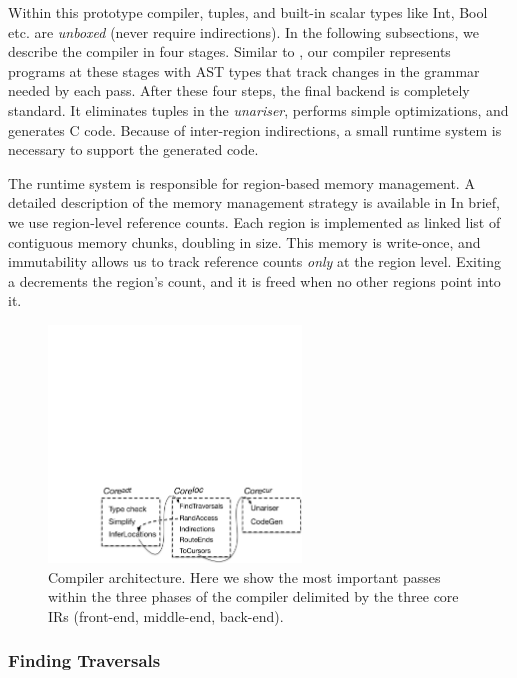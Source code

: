 Within this prototype compiler, tuples, and built-in scalar types like Int, Bool
etc. are \emph{unboxed} (never require indirections).
%
In the following subsections, we describe the
compiler in four stages.
{Similar to \lamcur, our compiler represents
  programs at these stages with AST types that track changes in the
  grammar needed by each pass.
  After these four steps,}
  the final backend is completely standard.  It eliminates
tuples in the \emph{unariser},
performs simple optimizations, and generates C code.
%
Because of inter-region indirections, a small \ourcalc runtime system is
necessary to support the generated code.

The \ourcalc runtime system is responsible for region-based memory management.
A detailed description of the memory management strategy is available in  %
In brief, we use region-level reference counts.  Each region is implemented as
linked list of contiguous memory chunks, doubling in size.  This memory is write-once,
and immutability allows us to track reference counts \emph{only} at the region
level.  Exiting a  decrements the region's count, and it is freed
when no other regions point into it.

\begin{figure}\center
  \includegraphics[width=0.6\textwidth]{compiler_arch}
  \caption{Compiler architecture.  Here we show the most important
    passes within the three phases of the compiler delimited by
    the three core IRs (front-end, middle-end, back-end).}
  \label{fig:compiler-arch}
\end{figure}

\subsubsection{Finding Traversals}
\label{sec:find-traversal}

